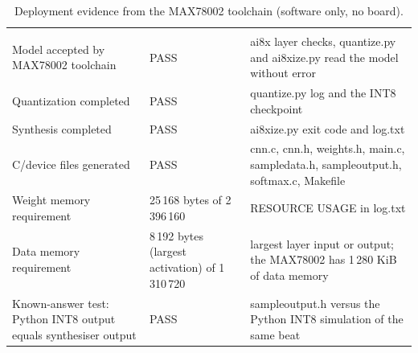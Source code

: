 \begin{table}[H]
  \centering
  \caption{Deployment evidence from the MAX78002 toolchain (software only, no board).}
  \label{tab:deployment-evidence}
  \begin{tabularx}{\linewidth}{YlY}
     &  &  \\
    Model accepted by MAX78002 toolchain & PASS & ai8x layer checks, quantize.py and ai8xize.py read the model without error \\
    Quantization completed & PASS & quantize.py log and the INT8 checkpoint \\
    Synthesis completed & PASS & ai8xize.py exit code and log.txt \\
    C/device files generated & PASS & cnn.c, cnn.h, weights.h, main.c, sampledata.h, sampleoutput.h, softmax.c, Makefile \\
    Weight memory requirement & 25\,168 bytes of 2\,396\,160 & RESOURCE USAGE in log.txt \\
    Data memory requirement & 8\,192 bytes (largest activation) of 1\,310\,720 & largest layer input or output; the MAX78002 has 1\,280 KiB of data memory \\
    Known-answer test: Python INT8 output equals synthesiser output & PASS & sampleoutput.h versus the Python INT8 simulation of the same beat \\
    \bottomrule
  \end{tabularx}
\end{table}
